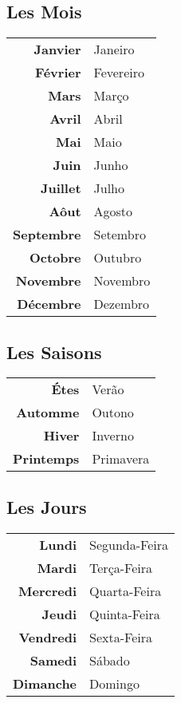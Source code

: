 \documentclass{article}
\begin{document}
        \raggedcolumns
        \begin{multicols}{3}
            \subsection{Les Mois}        
                \begin{tabular}{r l}
                    \textbf{Janvier}   & Janeiro\\
                    \textbf{Février}   & Fevereiro\\
                    \textbf{Mars}      & Março\\
                    \textbf{Avril}     & Abril\\
                    \textbf{Mai}       & Maio\\ 
                    \textbf{Juin}      & Junho\\
                    \textbf{Juillet}   & Julho\\
                    \textbf{Aôut}      & Agosto\\ 
                    \textbf{Septembre} & Setembro\\
                    \textbf{Octobre}   & Outubro\\
                    \textbf{Novembre}  & Novembro\\
                    \textbf{Décembre}  & Dezembro\\
                \end{tabular}    
        \columnbreak
            \subsection{Les Saisons}
                \begin{tabular}{r l}
                    \textbf{Étes}      & Verão\\
                    \textbf{Automme}   & Outono\\
                    \textbf{Hiver}     & Inverno\\
                    \textbf{Printemps} & Primavera\\
                \end{tabular}    
        \columnbreak
            \subsection{Les Jours}
                \begin{tabular}{r l}
                    \textbf{Lundi}    & Segunda-Feira\\
                    \textbf{Mardi}    & Terça-Feira\\
                    \textbf{Mercredi} & Quarta-Feira\\
                    \textbf{Jeudi}    & Quinta-Feira\\
                    \textbf{Vendredi} & Sexta-Feira\\
                    \textbf{Samedi}   & Sábado\\
                    \textbf{Dimanche} & Domingo\\ 
                \end{tabular}      
        \end{multicols}
    
\end{document}
